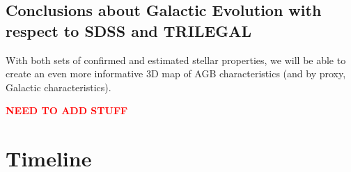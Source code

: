\subsection{Conclusions about Galactic Evolution with respect to SDSS and TRILEGAL}
With both sets of confirmed and estimated stellar properties, we will be able to create an even more informative 3D map of AGB characteristics (and by proxy, Galactic characteristics).

\begin{center}\textbf{\textcolor{red}{NEED TO ADD STUFF}}\end{center}

\section{Timeline}
